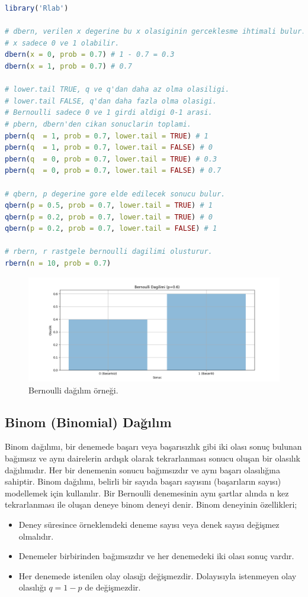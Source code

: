 \begin{lstlisting}[language=R]
library('Rlab')

# dbern, verilen x degerine bu x olasiginin gerceklesme ihtimali bulur.
# x sadece 0 ve 1 olabilir.
dbern(x = 0, prob = 0.7) # 1 - 0.7 = 0.3
dbern(x = 1, prob = 0.7) # 0.7

# lower.tail TRUE, q ve q'dan daha az olma olasiligi.
# lower.tail FALSE, q'dan daha fazla olma olasigi.
# Bernoulli sadece 0 ve 1 girdi aldigi 0-1 arasi.
# pbern, dbern'den cikan sonuclarin toplami.
pbern(q  = 1, prob = 0.7, lower.tail = TRUE) # 1
pbern(q  = 1, prob = 0.7, lower.tail = FALSE) # 0
pbern(q  = 0, prob = 0.7, lower.tail = TRUE) # 0.3
pbern(q  = 0, prob = 0.7, lower.tail = FALSE) # 0.7

# qbern, p degerine gore elde edilecek sonucu bulur.
qbern(p = 0.5, prob = 0.7, lower.tail = TRUE) # 1
qbern(p = 0.2, prob = 0.7, lower.tail = TRUE) # 0
qbern(p = 0.2, prob = 0.7, lower.tail = FALSE) # 1

# rbern, r rastgele bernoulli dagilimi olusturur.
rbern(n = 10, prob = 0.7)
\end{lstlisting}

\begin{figure}[h]
    \centering
    \includegraphics[width=1\textwidth]{images/bernoulli_distribution.png}
    \caption{Bernoulli dağılım örneği.}
    \label{fig:enter-label}
\end{figure}

\subsection{Binom (Binomial) Dağılım}
Binom dağılımı, bir denemede başarı veya başarısızlık gibi iki olası sonuç bulunan bağımsız ve aynı dairelerin ardışık olarak tekrarlanması sonucu oluşan bir olasılık dağılımıdır. Her bir denemenin sonucu bağımsızdır ve aynı başarı olasılığına sahiptir. Binom dağılımı, belirli bir sayıda başarı sayısını (başarıların sayısı) modellemek için kullanılır. Bir Bernoulli denemesinin aynı şartlar alında n kez tekrarlanması ile oluşan deneye binom deneyi denir. Binom deneyinin özellikleri;
\begin{itemize}
	\item Deney süresince örneklemdeki deneme sayısı veya denek sayısı değişmez olmalıdır.
	\item Denemeler birbirinden bağımsızdır ve her denemedeki iki olası sonuç vardır.
	\item Her denemede istenilen olay olasığı değişmezdir. Dolayısıyla istenmeyen olay olasılığı $q = 1 - p$ de değişmezdir.
\end{itemize}

